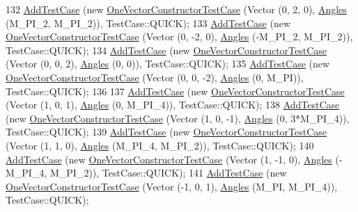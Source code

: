 \begin{DoxyCode}
132   \hyperlink{classns3_1_1TestCase_a3718088e3eefd5d6454569d2e0ddd835}{AddTestCase} (\textcolor{keyword}{new} \hyperlink{classOneVectorConstructorTestCase}{OneVectorConstructorTestCase} (Vector (0, 2, 0),  
         \hyperlink{structns3_1_1Angles}{Angles} (M\_PI\_2, M\_PI\_2)), TestCase::QUICK);
133   \hyperlink{classns3_1_1TestCase_a3718088e3eefd5d6454569d2e0ddd835}{AddTestCase} (\textcolor{keyword}{new} \hyperlink{classOneVectorConstructorTestCase}{OneVectorConstructorTestCase} (Vector (0, -2, 0), 
         \hyperlink{structns3_1_1Angles}{Angles} (-M\_PI\_2, M\_PI\_2)), TestCase::QUICK);
134   \hyperlink{classns3_1_1TestCase_a3718088e3eefd5d6454569d2e0ddd835}{AddTestCase} (\textcolor{keyword}{new} \hyperlink{classOneVectorConstructorTestCase}{OneVectorConstructorTestCase} (Vector (0, 0, 2),  
         \hyperlink{structns3_1_1Angles}{Angles} (0, 0)), TestCase::QUICK);
135   \hyperlink{classns3_1_1TestCase_a3718088e3eefd5d6454569d2e0ddd835}{AddTestCase} (\textcolor{keyword}{new} \hyperlink{classOneVectorConstructorTestCase}{OneVectorConstructorTestCase} (Vector (0, 0, -2), 
         \hyperlink{structns3_1_1Angles}{Angles} (0, M\_PI)), TestCase::QUICK);
136 
137   \hyperlink{classns3_1_1TestCase_a3718088e3eefd5d6454569d2e0ddd835}{AddTestCase} (\textcolor{keyword}{new} \hyperlink{classOneVectorConstructorTestCase}{OneVectorConstructorTestCase} (Vector (1, 0, 1),  
         \hyperlink{structns3_1_1Angles}{Angles} (0, M\_PI\_4)), TestCase::QUICK);
138   \hyperlink{classns3_1_1TestCase_a3718088e3eefd5d6454569d2e0ddd835}{AddTestCase} (\textcolor{keyword}{new} \hyperlink{classOneVectorConstructorTestCase}{OneVectorConstructorTestCase} (Vector (1, 0, -1), 
         \hyperlink{structns3_1_1Angles}{Angles} (0, 3*M\_PI\_4)), TestCase::QUICK);
139   \hyperlink{classns3_1_1TestCase_a3718088e3eefd5d6454569d2e0ddd835}{AddTestCase} (\textcolor{keyword}{new} \hyperlink{classOneVectorConstructorTestCase}{OneVectorConstructorTestCase} (Vector (1, 1, 0),  
         \hyperlink{structns3_1_1Angles}{Angles} (M\_PI\_4, M\_PI\_2)), TestCase::QUICK);
140   \hyperlink{classns3_1_1TestCase_a3718088e3eefd5d6454569d2e0ddd835}{AddTestCase} (\textcolor{keyword}{new} \hyperlink{classOneVectorConstructorTestCase}{OneVectorConstructorTestCase} (Vector (1, -1, 0), 
         \hyperlink{structns3_1_1Angles}{Angles} (-M\_PI\_4, M\_PI\_2)), TestCase::QUICK);
141   \hyperlink{classns3_1_1TestCase_a3718088e3eefd5d6454569d2e0ddd835}{AddTestCase} (\textcolor{keyword}{new} \hyperlink{classOneVectorConstructorTestCase}{OneVectorConstructorTestCase} (Vector (-1, 0, 1), 
         \hyperlink{structns3_1_1Angles}{Angles} (M\_PI, M\_PI\_4)), TestCase::QUICK);

\end{DoxyCode}
